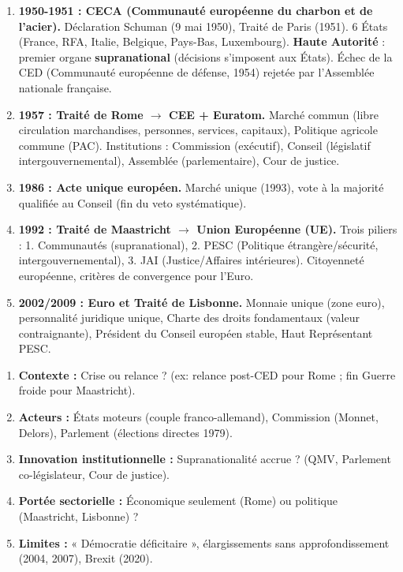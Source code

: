 \documentclass[11pt]{article}
\begin{document}
\begin{enumerate}
    \item \textbf{1950-1951 : CECA (Communauté européenne du charbon et de l'acier).} Déclaration Schuman (9 mai 1950), Traité de Paris (1951). 6 États (France, RFA, Italie, Belgique, Pays-Bas, Luxembourg). \textbf{Haute Autorité} : premier organe \textbf{supranational} (décisions s'imposent aux États). Échec de la CED (Communauté européenne de défense, 1954) rejetée par l'Assemblée nationale française.
    \item \textbf{1957 : Traité de Rome $\to$ CEE + Euratom.} Marché commun (libre circulation marchandises, personnes, services, capitaux), Politique agricole commune (PAC). Institutions : Commission (exécutif), Conseil (législatif intergouvernemental), Assemblée (parlementaire), Cour de justice.
    \item \textbf{1986 : Acte unique européen.} Marché unique (1993), vote à la majorité qualifiée au Conseil (fin du veto systématique).
    \item \textbf{1992 : Traité de Maastricht $\to$ Union Européenne (UE).} Trois piliers : 1. Communautés (supranational), 2. PESC (Politique étrangère/sécurité, intergouvernemental), 3. JAI (Justice/Affaires intérieures). Citoyenneté européenne, critères de convergence pour l'Euro.
    \item \textbf{2002/2009 : Euro et Traité de Lisbonne.} Monnaie unique (zone euro), personnalité juridique unique, Charte des droits fondamentaux (valeur contraignante), Président du Conseil européen stable, Haut Représentant PESC.
\end{enumerate}

\begin{methode}
\begin{enumerate}
    \item \textbf{Contexte :} Crise ou relance ? (ex: relance post-CED pour Rome ; fin Guerre froide pour Maastricht).
    \item \textbf{Acteurs :} États moteurs (couple franco-allemand), Commission (Monnet, Delors), Parlement (élections directes 1979).
    \item \textbf{Innovation institutionnelle :} Supranationalité accrue ? (QMV, Parlement co-législateur, Cour de justice).
    \item \textbf{Portée sectorielle :} Économique seulement (Rome) ou politique (Maastricht, Lisbonne) ?
    \item \textbf{Limites :} « Démocratie déficitaire », élargissements sans approfondissement (2004, 2007), Brexit (2020).
\end{enumerate}
\end{methode}
\end{document}
